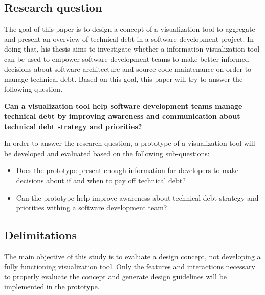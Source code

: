 \subsection{Research question}

The goal of this paper is to design a concept of a visualization tool to aggregate and present an overview of technical debt in a software development project.
In doing that, his thesis aims to investigate whether a information visualization tool can be used to empower software development teams to make better informed decisions about software architecture and source code maintenance on order to manage technical debt.
Based on this goal, this paper will try to answer the following question.

\smallskip
\textbf{
Can a visualization tool help software development teams manage technical debt by improving awareness and communication about technical debt strategy and priorities?
}
\smallskip

In order to answer the research question, a prototype of a visualization tool will be developed and evaluated based on the following sub-questions:
\begin{itemize}
\item Does the prototype present enough information for developers to make decisions about if and when to pay off technical debt?
\item Can the prototype help improve awareness about technical debt strategy and priorities withing a software development team?
\end{itemize}

\subsection{Delimitations}
The main objective of this study is to evaluate a design concept, not developing a fully functioning visualization tool.
Only the features and interactions necessary to properly evaluate the concept and generate design guidelines will be implemented in the prototype.